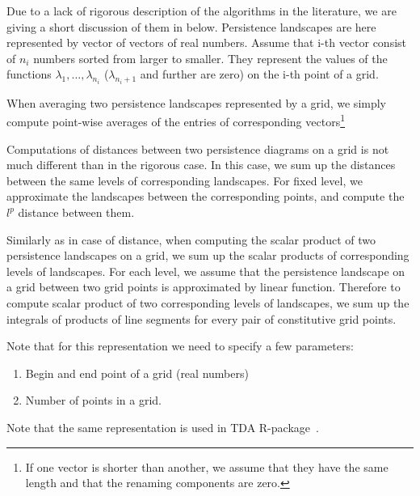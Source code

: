\documentclass[11pt]{article}
\begin{document}
Due to a lack of rigorous description of the algorithms in the literature, we are giving a short discussion of them in below. Persistence landscapes are here represented by vector of vectors of real numbers. Assume that i-th vector consist of $n_i$ numbers sorted from larger to smaller. They represent the values of the functions $\lambda_1,\ldots,\lambda_{n_i}$ ($\lambda_{n_i+1}$ and further are zero) on the i-th point of a grid. 

When averaging two persistence landscapes represented by a grid, we simply compute point-wise averages of the entries of corresponding vectors\footnote{If one vector is shorter than another, we assume that they have the same length and that the renaming components are zero.}

Computations of distances between two persistence diagrams on a grid is not much different than in the rigorous case. In this case, we sum up the distances between the same levels of corresponding landscapes. For fixed level, we approximate the landscapes between the corresponding points, and compute the $l^p$ distance between them.

Similarly as in case of distance, when computing the scalar product of two persistence landscapes on a grid, we sum up the scalar products of corresponding levels of landscapes. For each level, we assume that the persistence landscape on a grid between two grid points is approximated by linear function. Therefore to compute scalar product of two corresponding levels of landscapes, we sum up the integrals of products of line segments for every pair of constitutive grid points. 

Note that for this representation we need to specify a few parameters:
\begin{enumerate}
\item Begin and end point of a grid (real numbers)

\item Number of points in a grid.
\end{enumerate}

Note that the same representation is used in TDA R-package~\cite{tda}.
\end{document}

